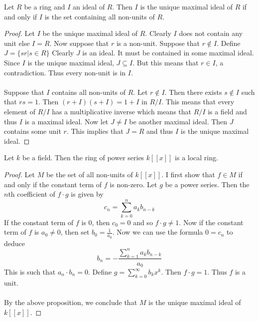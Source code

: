 \documentclass[a4paper]{article}
\begin{document}
\begin{prp}{}{} Let $R$ be a ring and $I$ an ideal of $R$. Then $I$ is the unique maximal ideal of $R$ if and only if $I$ is the set containing all non-units of $R$. \tcbline
\begin{proof}
Let $I$ be the unique maximal ideal of $R$. Clearly $I$ does not contain any unit else $I=R$. Now suppose that $r$ is a non-unit. Suppose that $r\notin I$. Define $J=\{sr|s\in R\}$ Clearly $J$ is an ideal. It must be contained in some maximal ideal. Since $I$ is the unique maximal ideal, $J\subseteq I$. But this means that $r\in I$, a contradiction. Thus every non-unit is in $I$. \\~\\
Suppose that $I$ contains all non-units of $R$. Let $r\notin I$. Then there exists $s\notin I$ such that $rs=1$. Then $(r+I)(s+I)=1+I$ in $R/I$. This means that every element of $R/I$ has a multiplicative inverse which means that $R/I$ is a field and thus $I$ is a maximal ideal. Now let $J\neq I$ be another maximal ideal. Then $J$ contains some unit $r$. This implies that $J=R$ and thus $I$ is the unique maximal ideal. 
\end{proof}
\end{prp}

\begin{eg}{}{} Let $k$ be a field. Then the ring of power series $k[[x]]$ is a local ring. \tcbline
\begin{proof}
Let $M$ be the set of all non-units of $k[[x]]$. I first show that $f\in M$ if and only if the constant term of $f$ is non-zero. Let $g$ be a power series. Then the $n$th coefficient of $f\cdot g$ is given by $$c_n=\sum_{k=0}^na_kb_{n-k}$$ If the constant term of $f$ is $0$, then $c_0=0$ and so $f\cdot g\neq 1$. Now if the constant term of $f$ is $a_0\neq 0$, then set $b_0=\frac{1}{a_0}$. Now we can use the formula $0=c_n$ to deduce $$b_n=-\frac{\sum_{k=1}^na_kb_{n-k}}{a_0}$$ This is such that $a_n\cdot b_n=0$. Define $g=\sum_{k=0}^\infty b_kx^k$. Then $f\cdot g=1$. Thus $f$ is a unit. \\~\\

By the above proposition, we conclude that $M$ is the unique maximal ideal of $k[[x]]$. 
\end{proof}
\end{eg}
\end{document}
